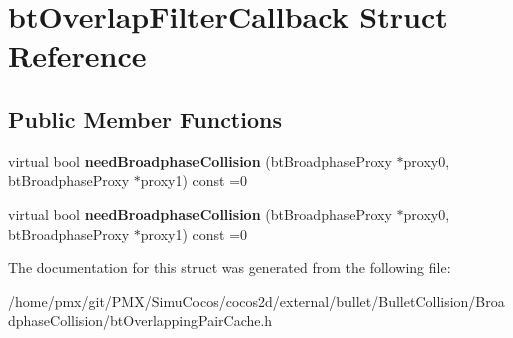 \hypertarget{structbtOverlapFilterCallback}{}\section{bt\+Overlap\+Filter\+Callback Struct Reference}
\label{structbtOverlapFilterCallback}
\subsection*{Public Member Functions}
\begin{DoxyCompactItemize}
\item 
\mbox{\label{structbtOverlapFilterCallback_a4139ebc9b115ab66fb70daa31a03d177}} 
virtual bool {\bfseries need\+Broadphase\+Collision} (bt\+Broadphase\+Proxy $\ast$proxy0, bt\+Broadphase\+Proxy $\ast$proxy1) const =0
\item 
\mbox{\label{structbtOverlapFilterCallback_a4139ebc9b115ab66fb70daa31a03d177}} 
virtual bool {\bfseries need\+Broadphase\+Collision} (bt\+Broadphase\+Proxy $\ast$proxy0, bt\+Broadphase\+Proxy $\ast$proxy1) const =0
\end{DoxyCompactItemize}


The documentation for this struct was generated from the following file\+:\begin{DoxyCompactItemize}
\item 
/home/pmx/git/\+P\+M\+X/\+Simu\+Cocos/cocos2d/external/bullet/\+Bullet\+Collision/\+Broadphase\+Collision/bt\+Overlapping\+Pair\+Cache.\+h\end{DoxyCompactItemize}
